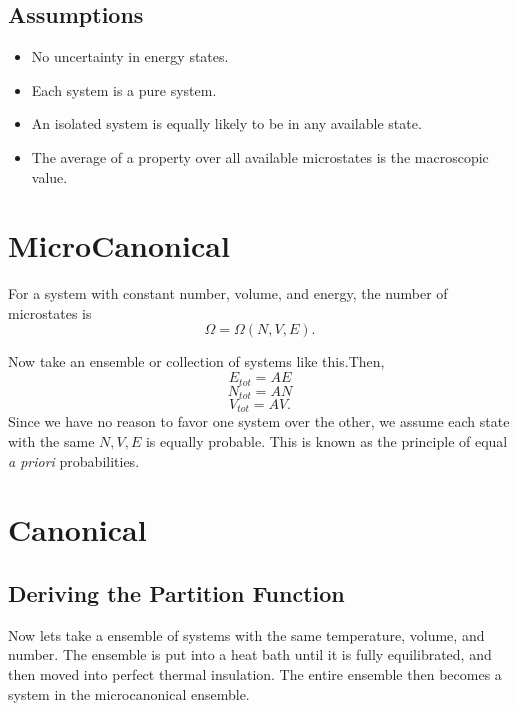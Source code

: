 
\subsection{Assumptions}

\begin{itemize}

	\item No uncertainty in energy states.

	\item Each system is a pure system.

	\item An isolated system is equally likely to be in any available state.

	\item The average of a property over all available microstates is the
		macroscopic value.

\end{itemize}

\section{MicroCanonical}\label{sec:MicroCanonical}

For a system with constant number, volume, and energy, the number of microstates
is \[ \Omega = \Omega(N, V, E).\]

Now take an ensemble or collection of systems like this.Then, \[ E_{tot} = A E
\]\[N_{tot} = A N \] \[ V_{tot} = A V.\]  Since we have no reason to favor one
system over the other, we assume each state with the same $N, V, E$ is equally
probable. This is known as the principle of equal \textit{a priori}
probabilities. 

\section{Canonical}\label{sec:Canonical}

\subsection{Deriving the Partition Function}

Now lets take a ensemble of systems with the same temperature, volume, and
number. The ensemble is put into a heat bath until it is fully equilibrated,
and then moved into perfect thermal insulation. The entire ensemble then becomes
a system in the microcanonical ensemble.

